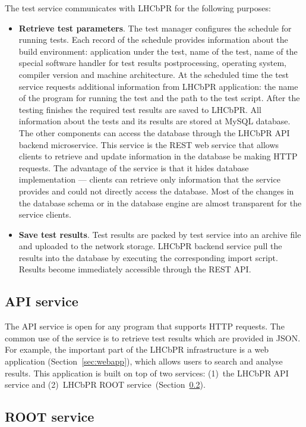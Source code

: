 \documentclass[a4paper]{jpconf}
\begin{document}
The test service communicates with LHCbPR for the following purposes:
\begin{itemize}
\item \textbf{Retrieve test parameters}. The test manager configures the schedule
for running tests. Each record of the schedule provides information about the
build environment: application under the test, name of the test, name of the
special software handler for test results postprocessing, operating system,
compiler version and machine architecture. At the scheduled time the test service
requests additional information from LHCbPR application: the name of the
program for running the test and the path to the test script. After the testing finishes
the required  test results are saved to LHCbPR. All information about the tests
and its results are stored at MySQL database. The other components can access the
database through the LHCbPR API backend microservice. This service is the REST web
service that allows clients to retrieve and update information in the database be making
HTTP requests. The advantage of the service is that it hides database
implementation --- clients can retrieve only information that the service provides
and could not directly access the database. Most of the changes in the database schema
or in the database engine are almost transparent for the service clients.

\item \textbf{Save test results}. Test results are packed by test service into
an archive file and uploaded to the network storage. LHCbPR backend service pull
the results into the database by executing the corresponding import script.
Results become immediately accessible through the REST API.
\end{itemize}

\subsection{API  service}
The API service is open for any program that supports HTTP
requests. The common use of the service is to retrieve test results which are
provided in JSON. For example, the important part of the LHCbPR
infrastructure is a web application (Section~\ref{sec:webapp}), which allows users
to search and analyse results. This
application is built on top of two services: (1)~the LHCbPR API service
and (2)~LHCbPR ROOT service~(Section~\ref{sec:rootapp}). 


\subsection{ROOT service}\label{sec:rootapp}
\end{document}
